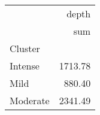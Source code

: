 \begin{tabular}{lr}
\toprule
{} &    depth \\
{} &      sum \\
Cluster  &          \\
\midrule
Intense  &  1713.78 \\
Mild     &   880.40 \\
Moderate &  2341.49 \\
\bottomrule
\end{tabular}
